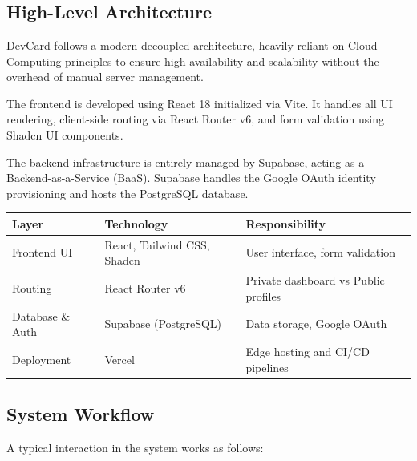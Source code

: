 \documentclass[12pt,a4paper]{report}     %
\begin{document}
\chapter{}

\section{High-Level Architecture}

DevCard follows a modern decoupled architecture, heavily reliant on Cloud Computing principles to ensure high availability and scalability without the overhead of manual server management.

The frontend is developed using React 18 initialized via Vite. It handles all UI rendering, client-side routing via React Router v6, and form validation using Shadcn UI components. 

The backend infrastructure is entirely managed by Supabase, acting as a Backend-as-a-Service (BaaS). Supabase handles the Google OAuth identity provisioning and hosts the PostgreSQL database.

\begin{center}
\begin{tabular}{|l|l|l|}
\hline
\textbf{Layer} & \textbf{Technology} & \textbf{Responsibility} \\
\hline
Frontend UI & React, Tailwind CSS, Shadcn & User interface, form validation \\
\hline
Routing & React Router v6 & Private dashboard vs Public profiles \\
\hline
Database \& Auth & Supabase (PostgreSQL) & Data storage, Google OAuth \\
\hline
Deployment & Vercel & Edge hosting and CI/CD pipelines \\
\hline
\end{tabular}
\end{center}

\vspace{0.3cm}

\section{System Workflow}

A typical interaction in the system works as follows:
\end{document}
